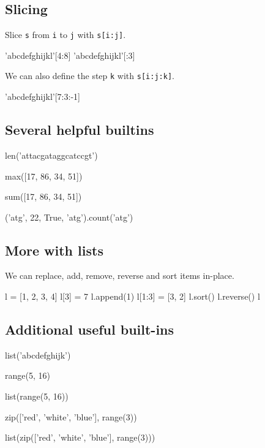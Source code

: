 \documentclass[aspectratio=1610,slidestop]{beamer}
\begin{document}
\subsection{Slicing}
\begin{pframe}
 Slice \texttt{s} from \texttt{i} to
 \texttt{j} with \texttt{s[i:j]}.
\begin{pyconsole}
'abcdefghijkl'[4:8]
'abcdefghijkl'[:3]
\end{pyconsole}
\medskip
\medskip
 We can also define the step \texttt{k} with
 \texttt{s[i:j:k]}.
\begin{pyconsole}
'abcdefghijkl'[7:3:-1]
\end{pyconsole}
\end{pframe}


\subsection{Several helpful builtins}
\begin{pframe}
\begin{pyconsole}
len('attacgataggcatccgt')

max([17, 86, 34, 51])

sum([17, 86, 34, 51])

('atg', 22, True, 'atg').count('atg')
\end{pyconsole}
\end{pframe}


\subsection{More with lists}
\begin{pframe}
 We can replace, add, remove, reverse and sort items in-place.
\begin{pyconsole}
l = [1, 2, 3, 4]
l[3] = 7
l.append(1)
l[1:3] = [3, 2]
l.sort()
l.reverse()
l
\end{pyconsole}
\end{pframe}


\subsection{Additional useful built-ins}
\begin{pframe}
\vspace{-0.25cm}
\begin{pyconsole}
list('abcdefghijk')

range(5, 16)

list(range(5, 16))

zip(['red', 'white', 'blue'], range(3))

list(zip(['red', 'white', 'blue'], range(3)))
\end{pyconsole}
\end{pframe}
\end{document}
